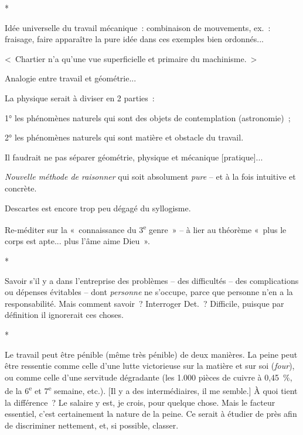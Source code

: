 \documentclass[french,twoside]{book} %
\begin{document}
\begin{center}
*\end{center}
\noindent Idée universelle du travail mécanique : combinaison de mouvements, ex. : fraisage, faire apparaître la pure idée dans ces exemples bien ordonnés...\par
< Chartier n'a qu'une vue superficielle et primaire du machinisme. >\par
Analogie entre travail et géométrie...\par
La physique serait à diviser en 2 parties :\par
1° les phénomènes naturels qui sont des objets de contemplation (astronomie) ;\par
2° les phénomènes naturels qui sont matière et obstacle du travail.\par
Il faudrait ne pas séparer géométrie, physique et mécanique [pratique]...\par
{\itshape Nouvelle méthode de raisonner} qui soit absolument {\itshape pure} – et à la fois intuitive et concrète.\par
Descartes est encore trop peu dégagé du syllogisme.\par
Re-méditer sur la « connaissance du 3\textsuperscript{e} genre » – à lier au théorème « plus le corps est apte... plus l'âme aime Dieu ».\par

\begin{center}
*\end{center}
\noindent Savoir s'il y a dans l'entreprise des problèmes – des difficultés – des complications ou dépenses évitables – dont {\itshape personne} ne s'occupe, parce que personne n’en a la responsabilité. Mais comment savoir ? Interroger Det. ? Difficile, puisque par définition il ignorerait ces choses.\par

\begin{center}
*\end{center}
\noindent Le travail peut être pénible (même très pénible) de deux manières. La peine peut être ressentie comme celle d'une lutte victorieuse sur la matière et sur soi ({\itshape four}), ou comme celle d'une servitude dégradante (les 1.000 pièces de cuivre à 0,45 \%, de la 6\textsuperscript{e} et 7\textsuperscript{e} semaine, etc.). [Il y a des intermédiaires, il me semble.] À quoi tient la différence ? Le salaire y est, je crois, pour quelque chose. Mais le facteur essentiel, c'est certainement la nature de la peine. Ce serait à étudier de près afin de discriminer nettement, et, si possible, classer.\par
\end{document}
